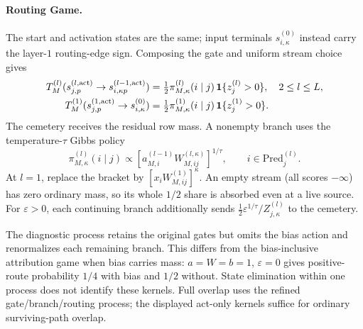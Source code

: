 \paragraph{Routing Game.}
The start and activation states are the same; input terminals $s^{(0)}_{i,\kappa}$ instead carry the layer-$1$ routing-edge sign. Composing the gate and uniform stream choice gives
\begin{align}
 T_M^{(l)}(s^{(l,\mathrm{act})}_{j,p}\to s^{(l-1,\mathrm{act})}_{i,\kappa p})
 &=\tfrac12\pi^{(l)}_{M,\kappa}(i\mid j)\,\mathbf{1}\{z_j^{(l)}>0\},\quad 2\le l\le L,\label{ptnb:eq:rg-T-act}\\
 T_M^{(1)}(s^{(1,\mathrm{act})}_{j,p}\to s^{(0)}_{i,\kappa})
 &=\tfrac12\pi^{(1)}_{M,\kappa}(i\mid j)\,\mathbf{1}\{z_j^{(1)}>0\}.\label{ptnb:eq:rg-T-pixel}
\end{align}
The cemetery receives the residual row mass. A nonempty branch uses the temperature-$\tau$ Gibbs policy
\begin{equation}\label{ptnb:eq:rg-T}
 \pi^{(l)}_{M,\kappa}(i\mid j)\propto
 [a^{(l-1)}_{M,i}W^{(l,\kappa)}_{M,ij}]^{1/\tau},\qquad i\in\mathrm{Pred}_j^{(l)}.
\end{equation}
At $l=1$, replace the bracket by $[x_iW^{(1)}_{M,ij}]^\kappa$. An empty stream (all scores $-\infty$) has zero ordinary mass, so its whole $1/2$ share is absorbed even at a live source. For $\varepsilon>0$, each continuing branch additionally sends $\tfrac12\varepsilon^{1/\tau}/Z^{(l)}_{j,\kappa}$ to the cemetery.

The diagnostic process retains the original gates but omits the bias action and renormalizes each remaining branch. This differs from the bias-inclusive attribution game when bias carries mass: $a=W=b=1$, $\varepsilon=0$ gives positive-route probability $1/4$ with bias and $1/2$ without. State elimination within one process does not identify these kernels. Full overlap uses the refined gate/branch/routing process; the displayed act-only kernels suffice for ordinary surviving-path overlap.


